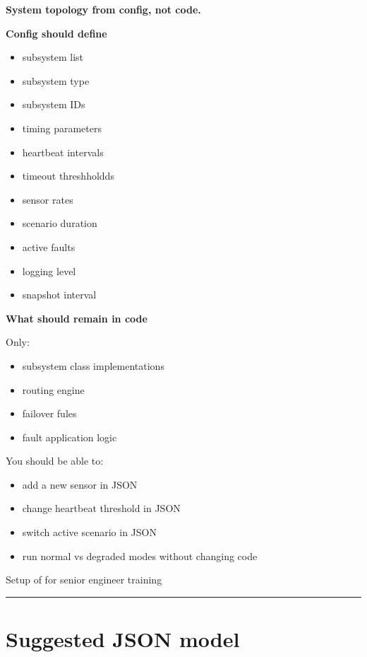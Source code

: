 \documentclass{report}
\begin{document}
\textbf{System topology from config, not code.}

\textbf{Config should define}
\begin{itemize}
   \item subsystem list
   \item subsystem type
   \item subsystem IDs
   \item timing parameters
   \item heartbeat intervals
   \item timeout threshholdds
   \item sensor rates
   \item scenario duration
   \item active faults
   \item logging level
   \item snapshot interval
\end{itemize}

\textbf{What should remain in code}

Only:
\begin{itemize}
   \item subsystem class implementations 
   \item routing engine
   \item failover fules
   \item fault application logic
\end{itemize}
You should be able to:
\begin{itemize}
   \item add a new sensor in JSON
   \item change heartbeat threshold in JSON
   \item switch active scenario in JSON
   \item run normal vs degraded modes without changing code
\end{itemize}
Setup of for senior engineer training

\begin{center}
\rule{0.9\textwidth}{1pt}
\end{center}
\section{Suggested JSON model}
\end{document}
